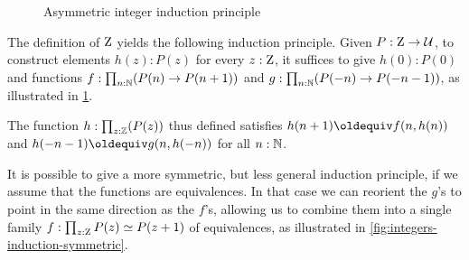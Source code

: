 \documentclass[a4paper,12pt]{amsart}
\begin{document}
\begin{figure}[b]
  \centering
  \caption{Asymmetric integer induction principle}
  \label{fig:integers-induction-asymmetric}
\end{figure}

The definition of $\mathrm{Z}$ yields the following induction principle.
Given $P : \mathrm{Z} \to \mathcal{U}$, to construct elements $h(z) : P(z)$ for every $z : \mathrm{Z}$,
it suffices to give $h(0): P(0)$ and functions
$f : \prod_{n:\mathbb{N}}(P(n) \to P(n+1))$ and
$g : \prod_{n:\mathbb{N}}(P(-n) \to P(-n-1))$,
as illustrated in \cref{fig:integers-induction-asymmetric}.

The function $h:\prod_{z:\mathbb{Z}}(P(z))$ thus defined satisfies
$h(n+1)\jdeq f(n,h(n))$ and $h(-n-1)\jdeq g(n,h(-n))$ for all $n:\mathbb{N}$.

It is possible to give a more symmetric, but less general induction principle,
if we assume that the functions are equivalences.
In that case we can reorient the $g$'s to point in the same direction as the $f$'s,
allowing us to combine them into a single family $f : \prod_{z:\mathrm{Z}}P(z) \simeq P(z+1)$ of equivalences,
as illustrated in \cref{fig:integers-induction-symmetric}.
\end{document}
